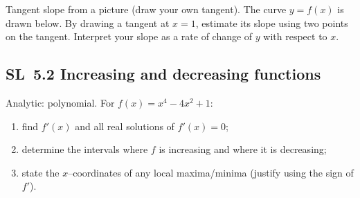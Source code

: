 \documentclass[11pt]{article}
\def\textbf#1{#1}%
\newcommand{\tocsubsection}[1]{\subsection{#1}}
\newcounter{question}
\begin{document}
\begin{question}
\textbf{Tangent slope from a picture (draw your own tangent).}
The curve $y=f(x)$ is drawn below. By drawing a tangent at $x=1$, estimate its slope using two points on the tangent. Interpret your slope as a rate of change of $y$ with respect to $x$.

\begin{center}
\end{center}
\end{question}




\tocsubsection{SL 5.2 \; Increasing and decreasing functions}


\begin{question}
\textbf{Analytic: polynomial.}
For $f(x)=x^{4}-4x^{2}+1$:
\begin{enumerate}
  \item find $f'(x)$ and all real solutions of $f'(x)=0$;
  \item determine the intervals where $f$ is increasing and where it is decreasing;
  \item state the $x$–coordinates of any local maxima/minima (justify using the sign of $f'$).
\end{enumerate}
\end{question}
\end{document}

